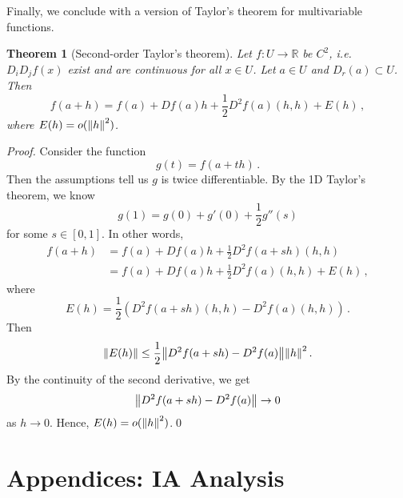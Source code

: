 \documentclass{article}
\theoremstyle{plain}\theoremheaderfont{\normalfont\itshape}\theorembodyfont{\rmfamily}\theoremseparator{.}\newtheorem*{rem}{Remark}\newtheorem*{ex}{Example}\newtheorem*{proof}{Proof}\newtheorem*{altp}{Alternative proof}
\theoremstyle{plain}\theoremheaderfont{\normalfont\bfseries}\theorembodyfont{\rmfamily}\theoremseparator{.}\newtheorem{thm}{Theorem}[section]\newtheorem{lem}[thm]{Lemma}\newtheorem{prop}[thm]{Proposition}\newtheorem*{cor}{Corollary}\newtheorem{defn}[thm]{Definition}\newtheorem{clm}[thm]{Claim}\newtheorem{clminproof}{Claim}
\theoremstyle{break}\theoremheaderfont{\normalfont\itshape}\theorembodyfont{\rmfamily}\theoremseparator{.\medskip}\newtheorem*{proofskip}{Proof}\newtheorem*{exs}{Examples}\newtheorem*{rems}{Remarks}
\theoremstyle{break}\theoremheaderfont{\normalfont\bfseries}\theorembodyfont{\rmfamily}\theoremseparator{.\medskip}\newtheorem{lemskip}[thm]{Lemma}\newtheorem{defnskip}[thm]{Definition}\newtheorem{propskip}[thm]{Proposition}\newtheorem{thmskip}[thm]{Theorem}
\newcommand{\qed}{\hfill\ensuremath{\Box}}
\begin{document}
    Finally, we conclude with a version of Taylor's theorem for multivariable functions.
    \begin{thm}[Second-order Taylor's theorem]
        Let \(f:U\to\mathbb{R}\) be \(C^2\), i.e. \(D_iD_jf(x)\) exist and are continuous for all \(x\in U\). Let \(a\in U\) and \(D_r(a)\subset U\). Then
        \[f(a+h)=f(a)+Df(a)h+\frac{1}{2}D^2f(a)(h,h)+E(h)\,,\]
        where \(E(h)=o(\norm{h}^2)\).
    \end{thm}
    \begin{proof}
        Consider the function
        \[g(t)=f(a+th)\,.\]
        Then the assumptions tell us \(g\) is twice differentiable. By the 1D Taylor's theorem, we know
        \[g(1)=g(0)+g'(0)+\frac{1}{2}g''(s)\]
        for some \(s\in[0,1]\). In other words,
        \begin{align*}
            f(a+h)&=f(a)+Df(a)h+\frac{1}{2}D^2f(a+sh)(h,h)\\
            &=f(a)+Df(a)h+\frac{1}{2}D^2f(a)(h,h)+E(h)\,,
        \end{align*}
        where
        \[E(h)=\frac{1}{2}(D^2f(a+sh)(h,h)-D^2f(a)(h,h))\,.\]
        Then
        \[\norm{E(h)}\le\frac{1}{2}\norm{D^2f(a+sh)-D^2f(a)}\norm{h}^2\,.\]
        By the continuity of the second derivative, we get
        \[\norm{D^2f(a+sh)-D^2f(a)}\to 0\]
        as \(h\to 0\). Hence, \(E(h)=o(\norm{h}^2)\).\qed

    \end{proof}



    \newpage
    \part*{Appendices: IA Analysis}
    \appendix
\end{document}
